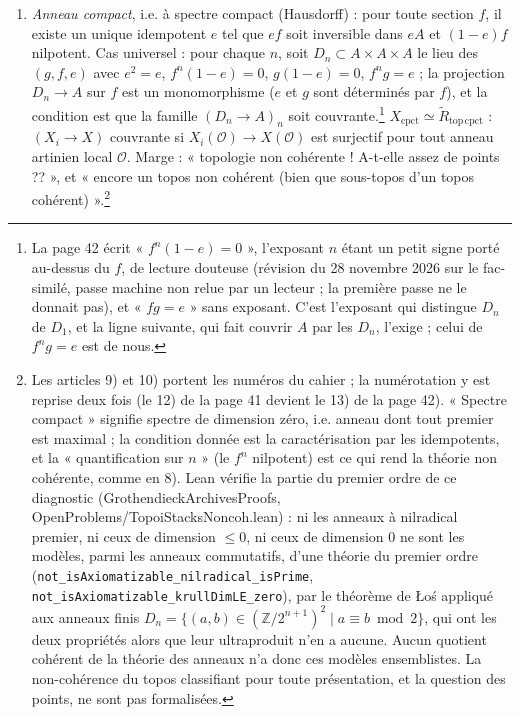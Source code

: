 \documentclass[11pt,a4paper]{article}
\begin{document}
\begin{enumerate}
\item[10)] \emph{Anneau compact}, i.e. à spectre compact (Hausdorff) :
pour toute section $f$, il existe un unique idempotent $e$ tel que $ef$
soit inversible dans $eA$ et $(1-e)f$ nilpotent. Cas universel : pour
chaque $n$, soit $D_{n} \subset A \times A \times A$ le lieu des $(g, f, e)$
avec $e^{2} = e$, $f^{n}(1-e) = 0$, $g(1-e) = 0$, $f^{n}g = e$ ; la
projection $D_{n} \to A$ sur $f$ est un monomorphisme ($e$ et $g$ sont
déterminés par $f$), et la condition est que la famille $(D_{n} \to
A)_{n}$ soit couvrante.\footnote{La page 42 écrit
« $f^{n}(1-e) = 0$ », l'exposant $n$ étant un petit signe porté au-dessus
du $f$, de lecture douteuse (révision du 28 novembre 2026 sur le fac-similé, passe machine non relue par un lecteur ;
la première passe ne le donnait pas), et « $fg = e$ » sans exposant. C'est
l'exposant qui distingue $D_{n}$ de $D_{1}$, et la ligne suivante, qui fait
couvrir $A$ par les $D_{n}$, l'exige ; celui de $f^{n}g = e$ est de nous.} $X_{\mathrm{cpct}} \simeq
\widetilde{R}_{\mathrm{top\,cpct}}$ : $(X_{i} \to X)$ couvrante si
$X_{i}(\mathcal{O}) \to X(\mathcal{O})$ est surjectif pour tout anneau
artinien local $\mathcal{O}$. Marge : « topologie non cohérente ! A-t-elle
assez de points ?? », et « encore un topos non cohérent (bien que sous-topos
d'un topos cohérent) ».\footnote{Les articles 9) et 10) portent les numéros
du cahier ; la numérotation y est reprise deux fois (le 12) de la page 41
devient le 13) de la page 42). « Spectre compact » signifie spectre de
dimension zéro, i.e. anneau dont tout premier est maximal ; la condition
donnée est la caractérisation par les idempotents, et la « quantification
sur $n$ » (le $f^{n}$ nilpotent) est ce qui rend la théorie non cohérente,
comme en 8). Lean vérifie la partie du premier ordre de ce diagnostic
(GrothendieckArchivesProofs, OpenProblems/TopoiStacksNoncoh.lean) : ni les anneaux
à nilradical premier, ni ceux de dimension $\leq 0$, ni ceux de dimension $0$ ne
sont les modèles, parmi les anneaux commutatifs, d'une théorie du premier ordre
(\texttt{not\_isAxiomatizable\_nilradical\_isPrime},
\texttt{not\_isAxiomatizable\_krullDimLE\_zero}), par le théorème de Łoś appliqué
aux anneaux finis $D_{n} = \{(a, b) \in (\mathbb{Z}/2^{n+1})^{2} \mid a \equiv b
\bmod 2\}$, qui ont les deux propriétés alors que leur ultraproduit n'en a aucune.
Aucun quotient cohérent de la théorie des anneaux n'a donc ces modèles
ensemblistes. La non-cohérence du topos classifiant pour toute présentation, et la
question des points, ne sont pas formalisées.}


\end{enumerate}
\end{document}
